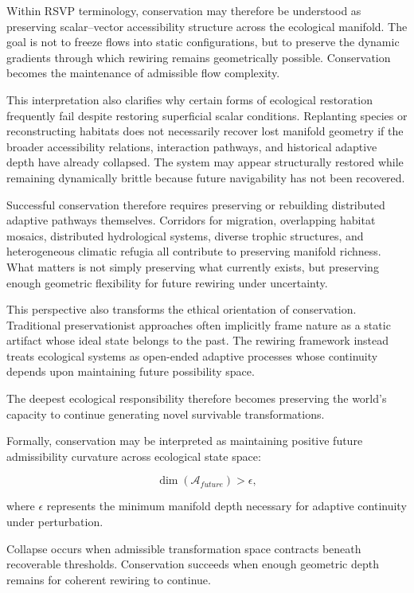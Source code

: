 \documentclass[11pt,a4paper]{article}
\newcommand{\Aspace}{\mathcal{A}}
\begin{document}
Within RSVP terminology, conservation may therefore be understood as preserving scalar--vector accessibility structure across the ecological manifold. The goal is not to freeze flows into static configurations, but to preserve the dynamic gradients through which rewiring remains geometrically possible. Conservation becomes the maintenance of admissible flow complexity.

This interpretation also clarifies why certain forms of ecological restoration frequently fail despite restoring superficial scalar conditions. Replanting species or reconstructing habitats does not necessarily recover lost manifold geometry if the broader accessibility relations, interaction pathways, and historical adaptive depth have already collapsed. The system may appear structurally restored while remaining dynamically brittle because future navigability has not been recovered.

Successful conservation therefore requires preserving or rebuilding distributed adaptive pathways themselves. Corridors for migration, overlapping habitat mosaics, distributed hydrological systems, diverse trophic structures, and heterogeneous climatic refugia all contribute to preserving manifold richness. What matters is not simply preserving what currently exists, but preserving enough geometric flexibility for future rewiring under uncertainty.

This perspective also transforms the ethical orientation of conservation. Traditional preservationist approaches often implicitly frame nature as a static artifact whose ideal state belongs to the past. The rewiring framework instead treats ecological systems as open-ended adaptive processes whose continuity depends upon maintaining future possibility space.

The deepest ecological responsibility therefore becomes preserving the world's capacity to continue generating novel survivable transformations.

Formally, conservation may be interpreted as maintaining positive future admissibility curvature across ecological state space:

\[
\dim(\Aspace_{future}) > \epsilon,
\]

where $\epsilon$ represents the minimum manifold depth necessary for adaptive continuity under perturbation.

Collapse occurs when admissible transformation space contracts beneath recoverable thresholds. Conservation succeeds when enough geometric depth remains for coherent rewiring to continue.
\end{document}
